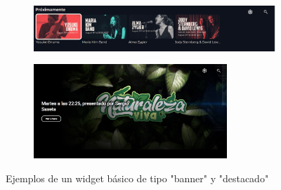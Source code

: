 \begin{figure}[H]
    \begin{subfigure}[c]{0.5\textwidth}
        \includegraphics[width=\textwidth]{imaxes/Widget_banner.png}
        \label{fig:Widget_banner}
    \end{subfigure}
    \hspace{0.1\textwidth}
    \begin{subfigure}[c]{0.5\textwidth}
        \includegraphics[width=0.8\textwidth]{imaxes/Widget_destacado.png}
        \label{fig:Widget_destacado}
    \end{subfigure}
    \caption{Ejemplos de un widget básico de tipo "banner" y "destacado"}
    \label{fig:Widget_banner_destacado}
\end{figure}

